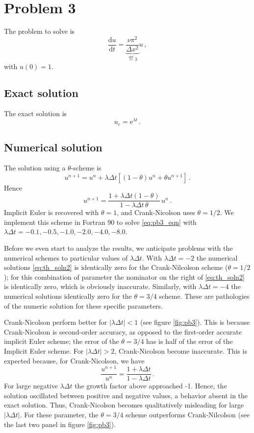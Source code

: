 \documentclass[11pt]{article}
\newcommand{\defn}{\stackrel{\text{def}}{=}}
\newcommand{\dd}{\mathrm{d}}
\newcommand{\ee}{\mathrm{e}}
\newcommand{\dt}{\Delta t}
\newcommand{\dx}{\Delta x}
\newcommand{\com}{\, ,}
\newcommand{\per}{\, .}
\def\beq{\begin{equation}}
\def\eeq{\end{equation}}
\begin{document}
\section*{Problem 3}
The problem to solve is
\beq
\label{eq:pb3_eqn}
\frac{\dd u}{\dd t} = \underbrace{\frac{\nu \pi^2}{\dx^2}}_{\defn \lambda} u\com
\eeq
with $u(0)=1$.
\subsection*{Exact solution}
The exact solution is
\beq
u_e = \ee^{\lambda t}\per
\eeq
\subsection*{Numerical solution}
The solution using a $\theta$-scheme is
\beq
\label{eq:th_soln}
u^{n+1} = u^n +  \lambda \dt [(1-\theta) u^n + \theta u^{n+1}]\per
\eeq
Hence
\beq
\label{eq:th_soln2}
u^{n+1} = \frac{1 + \lambda \dt (1-\theta)}{1-\lambda \dt \, \theta}\,u^n\per
\eeq
Implicit Euler is recovered with $\theta=1$, and Crank-Nicolson uses $\theta=1/2$. We implement this scheme in Fortran 90 to solve \eqref{eq:pb3_eqn} with $\lambda \dt = -0.1,-0.5,-1.0,-2.0,-4.0,-8.0$.

Before we even start to analyze the results, we anticipate problems with the numerical schemes to particular values of $\lambda \dt$. With $\lambda \dt = -2$ the numerical solutions \eqref{eq:th_soln2}  is identically zero for the Crank-Nilcolson scheme ($\theta = 1/2$); for this combination of parameter the nominator on the right of \eqref{eq:th_soln2} is identically zero, which is obviously inaccurate. Similarly, with $\lambda \dt = -4$ the numerical solutions identically zero for the $\theta = 3/4$ scheme. These are pathologies of the numeric solution for these specific parameters.

Crank-Nicolson perform better for $|\lambda \dt| < 1$ (see figure \ref{fig:pb3}). This is because Crank-Nicolson is second-order accuracy, as opposed to the first-order accurate implicit Euler scheme; the error of the $\theta=3/4$ has is half of the error of the Implicit Euler scheme. For   $|\lambda \dt| > 2$, Crank-Nicolson become inaccurate. This is expected because, for Crank-Nicolson, we have
\beq
\frac{u^{n+1}}{u^n} = \frac{1+\lambda \dt}{1-\lambda \dt}\per
\eeq
For large negative $\lambda \dt$ the growth factor above approached -1. Hence, the solution oscillated between positive and negative values, a behavior absent in the exact solution. Thus, Crank-Nicolson becomes qualitatively misleading for large $|\lambda \dt|$. For these parameter, the $\theta=3/4$ scheme outperforms Crank-Nilcolson (see the last two panel in figure \ref{fig:pb3}). 
\end{document}
